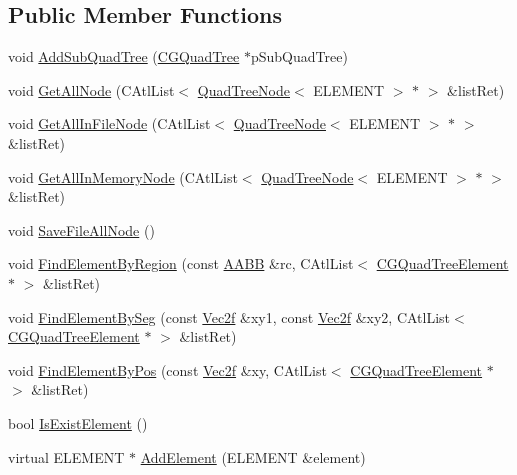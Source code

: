 \subsection*{Public Member Functions}
\begin{DoxyCompactItemize}
\item 
void \hyperlink{class_c_g_multi_quad_tree_a665304d78c04d80bc240ab6d21d363a3}{Add\+Sub\+Quad\+Tree} (\hyperlink{class_c_g_quad_tree}{C\+G\+Quad\+Tree} $\ast$p\+Sub\+Quad\+Tree)
\item 
void \hyperlink{class_c_g_multi_quad_tree_ad81fdc9479ba48b31d33197e27cbc210}{Get\+All\+Node} (C\+Atl\+List$<$ \hyperlink{class_quad_tree_node}{Quad\+Tree\+Node}$<$ E\+L\+E\+M\+E\+N\+T $>$ $\ast$ $>$ \&list\+Ret)
\item 
void \hyperlink{class_c_g_multi_quad_tree_a5771089539fab3195fc2ea083d76353f}{Get\+All\+In\+File\+Node} (C\+Atl\+List$<$ \hyperlink{class_quad_tree_node}{Quad\+Tree\+Node}$<$ E\+L\+E\+M\+E\+N\+T $>$ $\ast$ $>$ \&list\+Ret)
\item 
void \hyperlink{class_c_g_multi_quad_tree_afa17651f004dd6ef6892f6b72fabfd87}{Get\+All\+In\+Memory\+Node} (C\+Atl\+List$<$ \hyperlink{class_quad_tree_node}{Quad\+Tree\+Node}$<$ E\+L\+E\+M\+E\+N\+T $>$ $\ast$ $>$ \&list\+Ret)
\item 
void \hyperlink{class_c_g_multi_quad_tree_ae9d57f7536bb7d201647d8d41b31c262}{Save\+File\+All\+Node} ()
\item 
void \hyperlink{class_c_g_multi_quad_tree_aa47b54d98a18c142e851124de452b1a8}{Find\+Element\+By\+Region} (const \hyperlink{struct_a_a_b_b}{A\+A\+B\+B} \&rc, C\+Atl\+List$<$ \hyperlink{class_c_g_quad_tree_element}{C\+G\+Quad\+Tree\+Element} $\ast$ $>$ \&list\+Ret)
\item 
void \hyperlink{class_c_g_multi_quad_tree_aec8c534ee86b465a1de55098a4ca3c2a}{Find\+Element\+By\+Seg} (const \hyperlink{class_vec2f}{Vec2f} \&xy1, const \hyperlink{class_vec2f}{Vec2f} \&xy2, C\+Atl\+List$<$ \hyperlink{class_c_g_quad_tree_element}{C\+G\+Quad\+Tree\+Element} $\ast$ $>$ \&list\+Ret)
\item 
void \hyperlink{class_c_g_multi_quad_tree_adcabb60896871f29c2091e5efb4ad13a}{Find\+Element\+By\+Pos} (const \hyperlink{class_vec2f}{Vec2f} \&xy, C\+Atl\+List$<$ \hyperlink{class_c_g_quad_tree_element}{C\+G\+Quad\+Tree\+Element} $\ast$ $>$ \&list\+Ret)
\item 
bool \hyperlink{class_c_g_multi_quad_tree_ab8d4e231a9af77bb460955401230c6e4}{Is\+Exist\+Element} ()
\item 
virtual E\+L\+E\+M\+E\+N\+T $\ast$ \hyperlink{class_c_g_multi_quad_tree_ae7192b9d985c14322179d9ebf1b252c7}{Add\+Element} (E\+L\+E\+M\+E\+N\+T \&element)

\end{DoxyCompactItemize}
